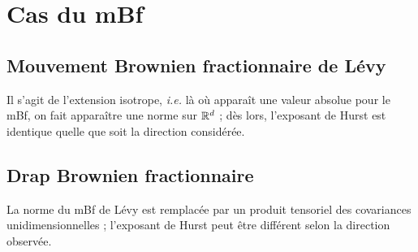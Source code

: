 \section{Cas du mBf}
\subsection{Mouvement Brownien fractionnaire de Lévy}
Il s'agit de l'extension isotrope, \emph{i.e.} là où apparaît une
valeur absolue pour le mBf, on fait apparaître une norme sur $\mathbb{R}^d$ ;
dès lors, l'exposant de Hurst est identique quelle que soit la
direction considérée.

\subsection{Drap Brownien fractionnaire}
La norme du mBf de Lévy est remplacée par un produit tensoriel des
covariances unidimensionnelles ; l'exposant de Hurst peut être
différent selon la direction observée.